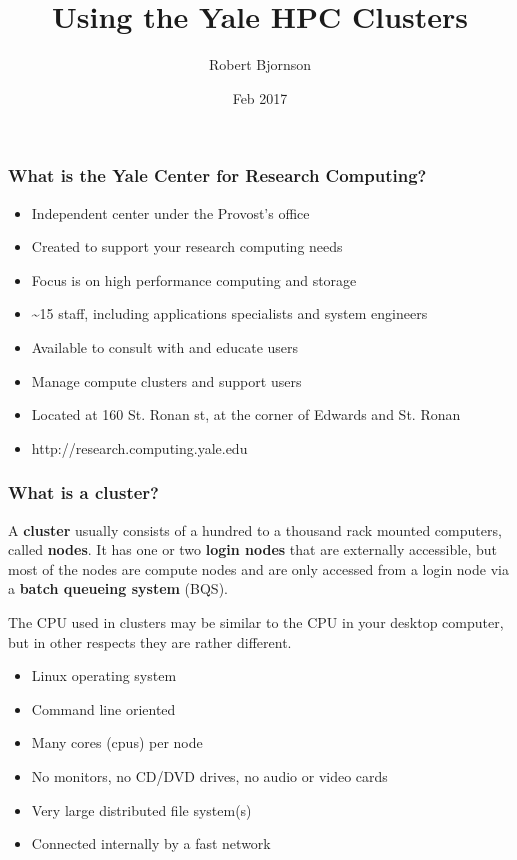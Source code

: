 \documentclass[10pt]{beamer}
\title{Using the Yale HPC Clusters}
\author{{Robert Bjornson}}
\institute[Yale]{
  Yale Center for Research Computing \\
  Yale University
}
\date{Feb 2017}
\begin{document}
\begin{frame}[plain]
  \titlepage
\end{frame}

\begin{frame}[fragile]
\frametitle{What is the Yale Center for Research Computing?}

\begin{itemize}
\item Independent center under the Provost's office
\item Created to support your research computing needs
\item Focus is on high performance computing and storage
\item \textasciitilde 15 staff, including applications specialists and system engineers
\item Available to consult with and educate users
\item Manage compute clusters and support users
\item Located at 160 St. Ronan st, at the corner of Edwards and St. Ronan
\item http://research.computing.yale.edu
\end{itemize}

\end{frame}

\begin{frame}
\frametitle{What is a cluster?}

A \textbf{cluster} usually consists of a hundred to a thousand rack mounted
computers, called \textbf{nodes}.  It has one or two \textbf{login nodes}
that are externally accessible, but most of the nodes are
compute nodes and are only accessed from a login node via a
\textbf{batch queueing system} (BQS).

\vskip10pt
The CPU used in clusters may be similar to the CPU in your
desktop computer, but in other respects they are rather different.

\begin{itemize}
\item Linux operating system
\item Command line oriented 
\item Many cores (cpus) per node
\item No monitors, no CD/DVD drives, no audio or video cards
\item Very large distributed file system(s)
\item Connected internally by a fast network
\end{itemize}
\end{frame}
\end{document}
